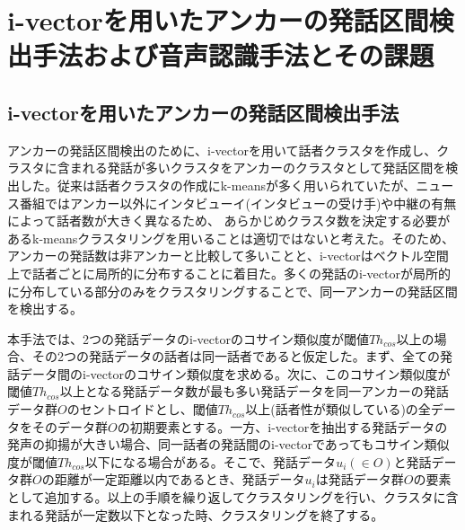 \chapter{i-vectorを用いたアンカーの発話区間検出手法および音声認識手法とその課題}

\section{i-vectorを用いたアンカーの発話区間検出手法\cite{nozaki_gakuseikai}}
\label{section:clustering}
アンカーの発話区間検出のために、i-vectorを用いて話者クラスタを作成し、クラスタに含まれる発話が多いクラスタをアンカーのクラスタとして発話区間を検出した。従来は話者クラスタの作成にk-meansが多く用いられていたが、ニュース番組ではアンカー以外にインタビューイ(インタビューの受け手)や中継の有無によって話者数が大きく異なるため、
あらかじめクラスタ数を決定する必要があるk-meansクラスタリングを用いることは適切ではないと考えた。そのため、アンカーの発話数は非アンカーと比較して多いことと、i-vectorはベクトル空間上で話者ごとに局所的に分布することに着目た。多くの発話のi-vectorが局所的に分布している部分のみをクラスタリングすることで、同一アンカーの発話区間を検出する。\par
本手法では、2つの発話データのi-vectorのコサイン類似度が閾値$Th_{cos}$以上の場合、その2つの発話データの話者は同一話者であると仮定した。まず、全ての発話データ間のi-vectorのコサイン類似度を求める。次に、このコサイン類似度が閾値$Th_{cos}$以上となる発話データ数が最も多い発話データを同一アンカーの発話データ群$O$のセントロイドとし、閾値$Th_{cos}$以上(話者性が類似している)の全データをそのデータ群$O$の初期要素とする。一方、i-vectorを抽出する発話データの発声の抑揚が大きい場合、同一話者の発話間のi-vectorであってもコサイン類似度が閾値$Th_{cos}$以下になる場合がある。そこで、発話データ$u_i(\in O)$と発話データ群$O$の距離が一定距離以内であるとき、発話データ$u_i$は発話データ群$O$の要素として追加する。以上の手順を繰り返してクラスタリングを行い、クラスタに含まれる発話が一定数以下となった時、クラスタリングを終了する。\par

\begin{comment}
\section{i-vectorを用いた音声認識手法\cite{yoshimura_clustering}}
\label{section:yoshimura_pre_clustering}
学習データに含まれる話者の音響特徴を考慮して木構造話者クラスタを作成し、各話者クラスタに含まれる学習データを用いて音響モデルを学習した。この木構造話者クラスタは、母音の定常状態であるHMMの中央の状態の平均と分散を用いたBhattacharyya距離によるk-means法によって作成した。クラスタの個数は、最上位のクラスタを2分割し、作成された2つのクラスタをさらに2分割した計７つのクラスタを使用する。\par
認識の際は、学習データに用いた話者のi-vectorと評価データのi-vectorのコサイン類似度を求める。求めたコサイン類似度の高い上位$n$人の学習データを全て含んでいるクラスタを選択し、選択したクラスタに含まれる学習データで学習した音響モデルを用いて音声認識を行なった。\par
\end{comment}

